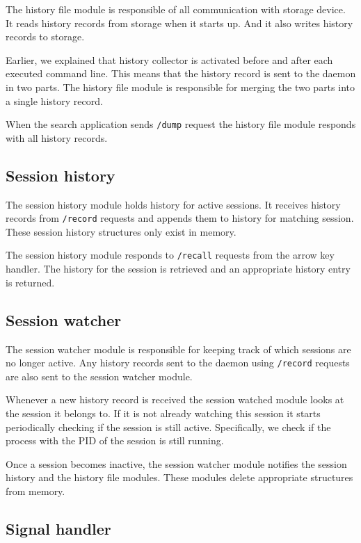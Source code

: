 The history file module is responsible of all communication with storage device. It reads history records from storage when it starts up. And it also writes history records to storage.

Earlier, we explained that history collector is activated before and after each executed command line. This means that the history record is sent to the daemon in two parts. The history file module is responsible for merging the two parts into a single history record. 

When the search application sends \verb|/dump| request the history file module responds with all history records. 


\subsection{Session history}

The session history module holds history for active sessions. It receives history records from \verb|/record| requests and appends them to history for matching session.
These session history structures only exist in memory.

The session history module responds to \verb|/recall| requests from the arrow key handler. The history for the session is retrieved and an appropriate history entry is returned. 

\subsection{Session watcher}

The session watcher module is responsible for keeping track of which sessions are no longer active. Any history records sent to the daemon using \verb|/record| requests are also sent to the session watcher module. 

Whenever a new history record is received the session watched module looks at the session it belongs to. If it is not already watching this session it starts periodically checking if the session is still active. Specifically, we check if the process with the PID of the session is still running.

Once a session becomes inactive, the session watcher module notifies the session history and the history file modules. These modules delete appropriate structures from memory.

\subsection{Signal handler}

